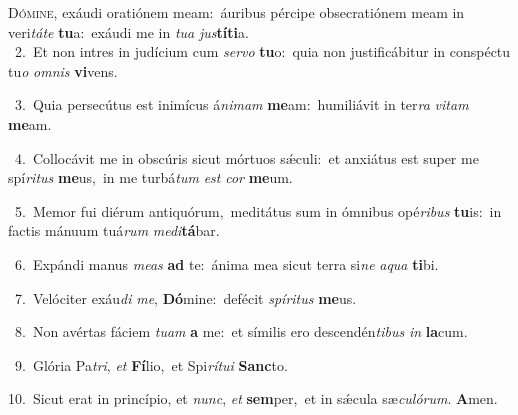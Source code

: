 \lettrine{\initial\textcolor{\initialcolor}{D}}{ómine,} exáudi oratiónem meam:~\dagger áuribus pércipe obsecratiónem meam in veri\-\textit{tá}\-\textit{te} \textbf{tu}\-a:~\star exáudi me in \textit{tu}\-\textit{a} \textit{jus}\-\textbf{tí}\textbf{ti}a.\\
{\numbfont\textcolor{\numbcolor}{~2.}}~Et non intres in judícium cum \textit{ser}\-\textit{vo} \textbf{tu}\-o:~\star quia non justificábitur in conspéctu tu\textit{o} \textit{om}\-\textit{nis} \textbf{vi}\-vens.\par
{\numbfont\textcolor{\numbcolor}{~3.}}~Quia persecútus est inimícus á\-\textit{ni}\-\textit{mam} \textbf{me}\-am:~\star humiliávit in ter\textit{ra} \textit{vi}\-\textit{tam} \textbf{me}\-am.\par
{\numbfont\textcolor{\numbcolor}{~4.}}~Collocávit me in obscúris sicut mórtuos sǽculi:~\dagger et anxiátus est super me spí\-\textit{ri}\-\textit{tus} \textbf{me}\-us,~\star in me turbá\textit{tum} \textit{est} \textit{cor} \textbf{me}\-um.\par
{\numbfont\textcolor{\numbcolor}{~5.}}~Memor fui diérum antiquórum,~\dagger meditátus sum in ómnibus opé\-\textit{ri}\-\textit{bus} \textbf{tu}\-is:~\star in factis mánuum tuá\textit{rum} \textit{me}\-\textit{di}\textbf{tá}bar.\par
{\numbfont\textcolor{\numbcolor}{~6.}}~Expándi manus \textit{me}\-\textit{as} \textbf{ad} te:~\star ánima mea sicut terra si\textit{ne} \textit{a}\-\textit{qua} \textbf{ti}\-bi.\par
{\numbfont\textcolor{\numbcolor}{~7.}}~Velóciter exáu\textit{di} \textit{me}\-, \textbf{Dó}\-mine:~\star defécit \textit{spí}\-\textit{ri}\textit{tus} \textbf{me}\-us.\par
{\numbfont\textcolor{\numbcolor}{~8.}}~Non avértas fáciem \textit{tu}\-\textit{am} \textbf{a} me:~\star et símilis ero descendén\-\textit{ti}\-\textit{bus} \textit{in} \textbf{la}\-cum.\par
{\numbfont\textcolor{\numbcolor}{~9.}}~Glória Pa\-\textit{tri}\-, \textit{et} \textbf{Fí}\-lio,~\star et Spi\-\textit{rí}\-\textit{tu}\textit{i} \textbf{Sanc}\-to.\par
{\numbfont\textcolor{\numbcolor}{10.}}~Sicut erat in princípio, et \textit{nunc}\-, \textit{et} \textbf{sem}\-per,~\star et in sǽcula sæ\-\textit{cu}\-\textit{ló}\textit{rum}. \textbf{A}\-men.\par
